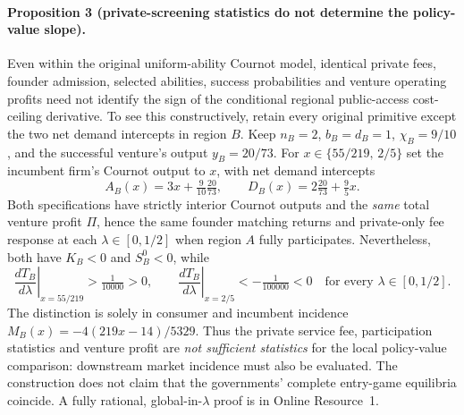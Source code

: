 \paragraph{Proposition 3 (private-screening statistics do not determine the policy-value slope).}
\label{prop:screening-insufficient}
Even within the original uniform-ability Cournot model, identical private
fees, founder admission, selected abilities, success probabilities and
venture operating profits need not identify the sign of the conditional
regional public-access cost-ceiling derivative.
To see this constructively, retain every original primitive except the
two net demand intercepts in region $B$. Keep $n_B=2$,
$b_B=d_B=1$, $\chi_B=9/10$, and the successful venture's output
$y_B=20/73$. For $x\in\{55/219,\,2/5\}$ set the incumbent firm's
Cournot output to $x$, with net demand intercepts
\begin{equation}
 A_B(x)=3x+\tfrac9{10}\tfrac{20}{73},\qquad
 D_B(x)=2\tfrac{20}{73}+\tfrac95 x.
 \label{eq:incidence-twin-cournot}
\end{equation}
Both specifications have strictly interior Cournot outputs and the
\emph{same} total venture profit $\Pi$, hence the same
founder matching returns and private-only fee response at each
$\lambda\in[0,1/2]$ when region $A$ fully participates.
Nevertheless, both have $K_B<0$ and $S_B^0<0$, while
\begin{equation}
 \left.\frac{dT_B}{d\lambda}\right|_{x=55/219}
    >\tfrac1{10000}>0,\qquad
 \left.\frac{dT_B}{d\lambda}\right|_{x=2/5}
    <-\tfrac1{100000}<0
 \quad\text{for every }\lambda\in[0,1/2].
 \label{eq:incidence-twin-signs}
\end{equation}
The distinction is solely in consumer and incumbent incidence
$M_B(x)=-4(219x-14)/5329$. Thus the private service fee,
participation statistics and venture profit are \emph{not sufficient
statistics} for the local policy-value comparison: downstream market
incidence must also be evaluated. The construction does not claim that
the governments' complete entry-game equilibria coincide.
A fully rational, global-in-$\lambda$ proof is in Online Resource~1.

